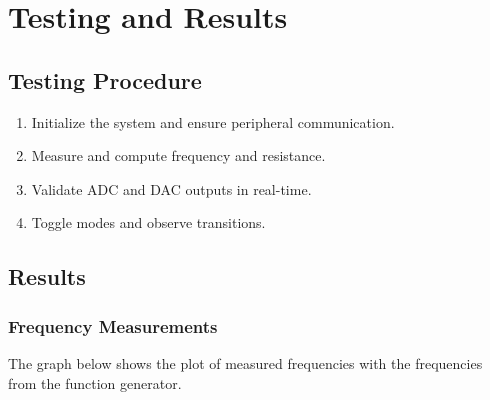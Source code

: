 \documentclass[12pt]{article}
\begin{document}
\section{Testing and Results}
\subsection{Testing Procedure}
\begin{enumerate}[leftmargin=2em]
    \item Initialize the system and ensure peripheral communication.
    \item Measure and compute frequency and resistance.
    \item Validate ADC and DAC outputs in real-time.
    \item Toggle modes and observe transitions.
\end{enumerate}

\subsection{Results}

\subsubsection{Frequency Measurements}
\label{subsubsec:results}

The graph below shows the plot of measured frequencies with the frequencies from the function generator.
\end{document}

